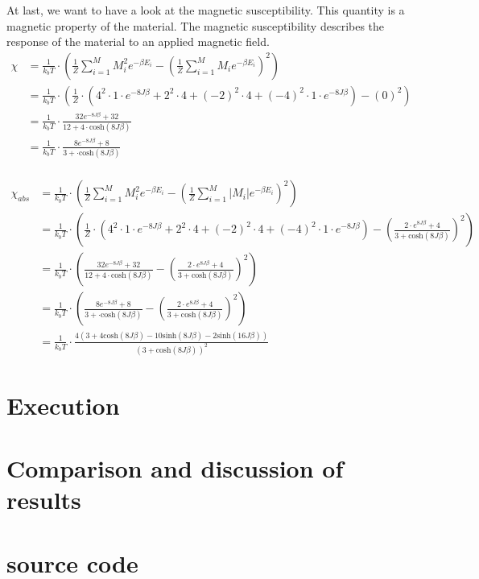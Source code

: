 \documentclass[10pt,a4paper]{article}
\begin{document}
At last, we want to have a look at the magnetic susceptibility. This quantity is a magnetic property of the material. The magnetic susceptibility describes the response of the material to an applied magnetic field. 
\begin{align}
\chi &= \frac{1}{k_b T} \cdot \left( \frac{1}{Z} \sum_{i=1}^{M} M_i^2 e^{- \beta E_i } - \left( \frac{1}{Z} \sum_{i=1}^{M} M_i e^{- \beta E_i }  \right)^2 \right)\\
&= \frac{1}{k_b T} \cdot \left( \frac{1}{Z} \cdot \left( 4^2 \cdot 1 \cdot e^{-8J\beta}+ 2^2 \cdot 4+(-2)^2 \cdot 4 + (-4)^2 \cdot 1 \cdot e^{-8J \beta } \right) - \left( 0  \right)^2 \right)\\
&= \frac{1}{k_b T} \cdot \frac{32 e^{-8J\beta}+32}{ 12+ 4 \cdot \mathrm{cosh} \left( 8J \beta \right)}\\
&= \frac{1}{k_b T} \cdot \frac{8 e^{-8J\beta}+8}{ 3+ \cdot \mathrm{cosh} \left( 8J \beta \right)}\\
\end{align}

\begin{align}
\chi_{abs} &= \frac{1}{k_b T} \cdot \left( \frac{1}{Z} \sum_{i=1}^{M} M_i^2 e^{- \beta E_i } - \left( \frac{1}{Z} \sum_{i=1}^{M} |M_i| e^{- \beta E_i }  \right)^2 \right)\\
&= \frac{1}{k_b T} \cdot \left( \frac{1}{Z} \cdot \left( 4^2 \cdot 1 \cdot e^{-8J\beta}+ 2^2 \cdot 4+(-2)^2 \cdot 4 + (-4)^2 \cdot 1 \cdot e^{-8J \beta } \right) - \left( \frac{2 \cdot e^{8J\beta}+4}{3+ \mathrm{cosh}(8J\beta)} \right)^2 \right)\\
&= \frac{1}{k_b T} \cdot \left( \frac{32 e^{-8J\beta}+32}{ 12+ 4 \cdot \mathrm{cosh} \left( 8J \beta \right)}- \left( \frac{2 \cdot e^{8J\beta}+4}{3+ \mathrm{cosh}(8J\beta)} \right)^2 \right)\\
&= \frac{1}{k_b T} \cdot \left(\frac{8 e^{-8J\beta}+8}{ 3+ \cdot \mathrm{cosh} \left( 8J \beta \right)}- \left( \frac{2 \cdot e^{8J\beta}+4}{3+ \mathrm{cosh}(8J\beta)} \right)^2 \right)\\
&=\frac{1}{k_b T} \cdot  \frac{4 (3+4 \mathrm{cosh}(8 J \beta)-10 \mathrm{sinh}(8 J \beta)-2 \mathrm{sinh}(16 J \beta))}{(3+\mathrm{cosh}(8 J \beta))^2}
\end{align}

\section{Execution}

\section{Comparison and discussion of results}

\section{source code}
\end{document}
